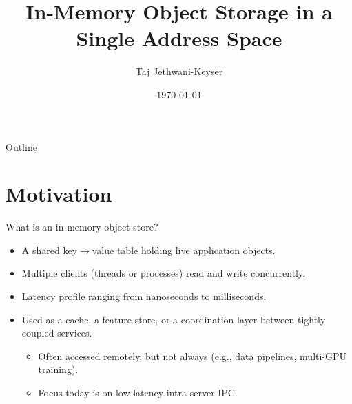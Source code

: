 \documentclass[10pt,aspectratio=169]{beamer}
\title{In-Memory Object Storage in a Single Address Space}
\subtitle{}
\author{Taj Jethwani-Keyser}
\institute{Harvard SEAS}
\date{\today}
\begin{document}
\maketitle

\begin{frame}{Outline}
	\tableofcontents
\end{frame}

\section{Motivation}

\begin{frame}{What is an in-memory object store?}
	\begin{itemize}
		\item A shared key$\to$value table holding live application objects.
        \item Multiple clients (threads or processes) read and write
        concurrently.
		\item Latency profile ranging from nanoseconds to milliseconds.
        \item Used as a cache, a feature store, or a coordination layer between
        tightly coupled services.
          \begin{itemize}
              \item Often accessed remotely, but not always (e.g., data
              pipelines, multi-GPU training).
              \item Focus today is on low-latency intra-server IPC.
          \end{itemize}
	\end{itemize}
\end{frame}
\end{document}
